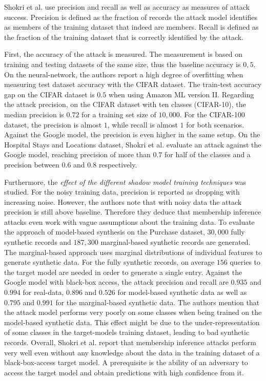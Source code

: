 \documentclass[runningheads]{llncs}
\begin{document}
Shokri et al. \cite{shokri2017membership} use precision and recall as well as accuracy as measures of attack success. Precision is defined as the fraction of records the attack model identifies as members of the training dataset that indeed are members. Recall is defined as the fraction of the training dataset that is correctly identified by the attack.
\par
First, the accuracy of the attack is measured. The measurement is based on training and testing datasets of the same size, thus the baseline accuracy is $0,5$. On the neural-network, the authors report a high degree of overfitting when measuring test dataset accuracy with the CIFAR dataset. The train-test accuracy gap on the CIFAR dataset is $0.5$ when using Amazon ML version II. Regarding the attack precision, on the CIFAR dataset with ten classes (CIFAR-10), the median precision is $0.72$ for a training set size of $10,000$. For the CIFAR-100 dataset, the precision is almost $1$, while recall is almost $1$ for both scenarios. Against the Google model, the precision is even higher in the same setup.
On the Hospital Stays and Locations dataset, Shokri et al. \cite{shokri2017membership} evaluate an attack against the Google model, reaching precision of more than $0.7$ for half of the classes and a precision between $0.6$ and $0.8$ respectively.
\par
Furthermore, the \textit{effect of the different shadow model training techniques} was studied. For the noisy training data, precision is reported as dropping with increasing noise. However, the authors note that with noisy data the attack precision is still above baseline. Therefore they deduce that membership inference attacks even work with vague assumptions about the training data.
To evaluate the approach of model-based synthesis on the Purchase dataset, $30,000$ fully synthetic records and $187,300$ marginal-based synthetic records are generated. The marginal-based approach uses marginal distributions of individual features to generate synthetic data. For the fully synthetic records, on average $156$ queries to the target model are needed in order to generate a single entry. Against the Google model with black-box access, the attack precision and recall are $0.935$ and $0.994$ for real-data, $0.896$ and $0.526$ for model-based synthetic data as well as $0.795$ and $0.991$ for the marginal-based synthetic data. The authors mention that the attack model performs very poorly on some classes when being trained on the model-based synthetic data. This effect might be due to the under-representation of some classes in the target-models training dataset, leading to bad synthetic records. Overall, Shokri et al. \cite{shokri2017membership} report that membership inference attacks perform very well even without any knowledge about the data in the training dataset of a black-box-access target model. A prerequisite is the ability of an adversary to access the target model and obtain predictions with high confidence from it.
\end{document}
